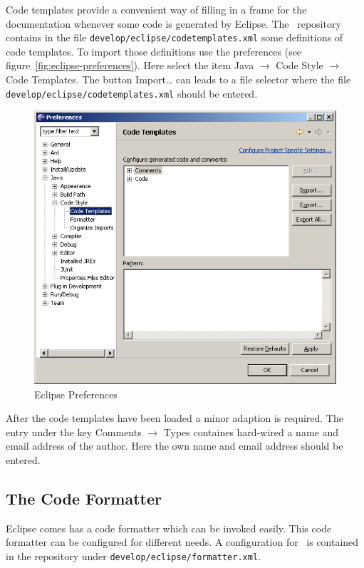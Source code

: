 \documentclass{extex-doc}
\newcommand\menu{\textsf}
\newcommand\sub{\(\rightarrow\) }
\newcommand\File[1]{\texttt{#1}}
\begin{document}
Code templates provide a convenient way of filling in a frame for the
documentation whenever some code is generated by Eclipse. The \ExTeX\ 
repository contains in the file
\File{develop/eclipse/codetemplates.xml} some definitions of code
templates. To import those definitions use the preferences (see
figure~\ref{fig:eclipse-preferences}). Here select the item \menu{Java
  \sub Code Style \sub Code Templates}. The button \menu{Import\ldots}
can leads to a file selector where the file
\File{develop/eclipse/codetemplates.xml} should be entered.
\begin{figure}[htp]
  \centering  \includegraphics[scale=.4]{image/eclipse-templates}
  \caption{Eclipse Preferences}\label{fig:eclipse-templates}
\end{figure}

After the code templates have been loaded a minor adaption is
required. The entry under the key \menu{Comments \sub Types} containes
hard-wired a name and email address of the author. Here the own name
and email address should be entered.


\subsection{The Code Formatter}

Eclipse comes has a code formatter which can be invoked easily. This
code formatter can be configured for different needs. A configuration
for \ExTeX\ is contained in the repository under
\texttt{develop/eclipse/formatter.xml}.
\end{document}
